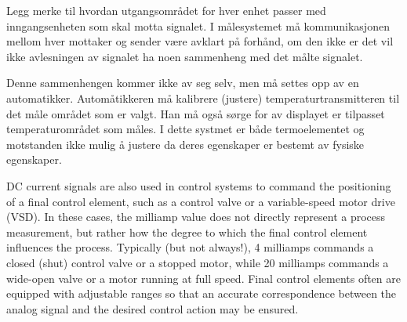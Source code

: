 Legg merke til hvordan utgangsområdet for hver enhet passer med inngangsenheten som skal motta signalet. I målesystemet må kommunikasjonen mellom hver mottaker og sender være avklart på forhånd, om den ikke er det vil ikke avlesningen av signalet ha noen sammenheng med det målte signalet. 


Denne sammenhengen kommer ikke av seg selv, men må settes opp av en automatikker. Automåtikkeren må kalibrere (justere) temperaturtransmitteren til det måle området som er valgt. Han må også sørge for av displayet er tilpasset temperaturområdet som måles. I dette systmet er både termoelementet og motstanden ikke mulig å justere da deres egenskaper er bestemt av fysiske egenskaper. 

  
\vskip 10pt

\filbreak

DC current signals are also used in control systems to command the positioning of a final control element, such as a control valve or a variable-speed motor drive (VSD).  In these cases, the milliamp value does not directly represent a process measurement, but rather how the degree to which the final control element influences the process.  Typically (but not always!), 4 milliamps commands a closed (shut) control valve or a stopped motor, while 20 milliamps commands a wide-open valve or a motor running at full speed.  Final control elements often are equipped with adjustable ranges so that an accurate correspondence between the analog signal and the desired control action may be ensured.

\vskip 10pt

